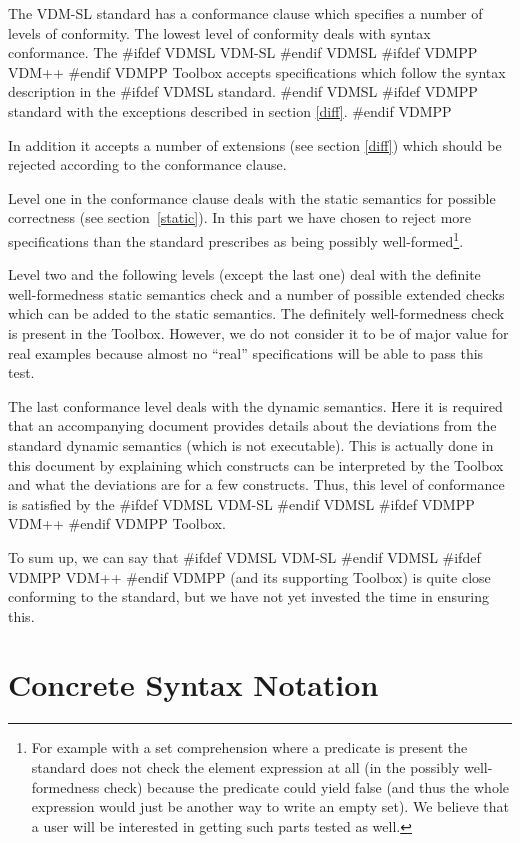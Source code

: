 \documentclass[\pformat,12pt]{article}
\newcommand{\vdmslpp}[2]{%
#ifdef VDMSL
#1
#endif VDMSL
#ifdef VDMPP
#2
#endif VDMPP
}
\newcommand{\vdmsl}{VDM-SL}
\newcommand{\vdmpp}{VDM++}
\begin{document}
The VDM-SL standard has a conformance clause which specifies a number
of levels of conformity. The lowest level of conformity deals with
syntax conformance. The  \vdmslpp{\vdmsl}{\vdmpp} Toolbox accepts
specifications which follow the syntax description in the
\vdmslpp{standard.}{standard with the exceptions described in section
\ref{diff}.}

In addition it accepts a number of extensions (see section \ref{diff})
which should be rejected according to the conformance clause.

Level one in the conformance clause deals with the static semantics
for possible correctness (see section~\ref{static}). 
In this part we have chosen to reject more
specifications than the standard prescribes as being possibly
well-formed\footnote{For example with a set comprehension where a
  predicate is present the standard does not check the element
  expression at all (in the possibly well-formedness check) because
  the predicate could yield false (and thus the whole expression would
  just be another way to write an empty set). We believe that a user
  will be interested in getting such parts tested as well.}.

Level two and the following levels (except the last one) deal with the
definite well-formedness static semantics check and a number of
possible extended checks which can be added to the static semantics.
The definitely well-formedness check is present in the
Toolbox. However, we do not consider it to be of major value for real
examples because almost no ``real'' specifications will be able to
pass this test.

The last conformance level deals with the dynamic semantics. Here it
is required that an accompanying document provides details about the
deviations from the standard dynamic semantics (which is not
executable). This is actually done in this document by explaining
which constructs can be interpreted by the Toolbox and what the
deviations are for a few constructs. Thus, this level of conformance
is satisfied by the  \vdmslpp{VDM-SL}{\vdmpp} Toolbox.

To sum up, we can say that  \vdmslpp{VDM-SL}{\vdmpp} (and its
supporting Toolbox) is quite close conforming to the standard, but we
have not yet invested the time in ensuring this.

\section{Concrete Syntax Notation}
\label{syntax-notation}
\end{document}
